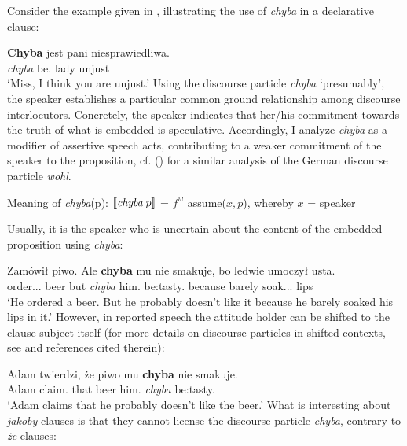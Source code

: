 \documentclass[output=paper
,modfonts
,nonflat]{langsci/langscibook}
\begin{document}
\noindent Consider the example given in , illustrating the use of \emph{chyba} in a declarative clause:

\ea \gll \textbf{Chyba} jest pani niesprawiedliwa. \label{chyba} \\
		\emph{chyba} be.{\thirdperson}{\sg} lady unjust \\
\glt	`Miss, I think you are unjust.' 
\z
Using the discourse particle \emph{chyba} `presumably', the speaker establishes a particular common ground relationship among discourse interlocutors. Concretely, the speaker indicates that her\slash his commitment towards the truth of what is embedded is speculative. Accordingly, I analyze \emph{chyba} as a modifier of assertive speech acts, contributing to a weaker commitment of the speaker to the proposition, cf. \citeauthor{Zimmermann2004} (\citeyear{Zimmermann2004, Zimmermann2011a})  for a similar analysis of the German discourse particle \emph{wohl}.

\ea	Meaning of \emph{chyba}(p): \newline
	\([\![\emph{chyba} \; p]\!]\) = $f^{w}$ assume(\( x,p \)), whereby \(x\) = speaker
\z

\noindent Usually, it is the speaker who is uncertain about the content of the embedded proposition using \emph{chyba}:

\ea \gll Zamówił piwo. Ale \textbf{chyba} mu nie smakuje, bo ledwie umoczył usta. \\
		order.{\lptcp}.{\sg}.{\masc} beer but \emph{chyba} him.{\dat} {\negation} {be:tasty}.{\thirdperson}{\sg} because barely soak.{\lptcp}.{\sg}.{\masc} lips \\
\glt	`He ordered a beer. But he probably doesn't like it because he barely soaked his lips in it.' 
\z
However, in reported speech the attitude holder can be shifted to the clause subject itself (for more details on discourse particles in shifted contexts, see \textcite{Doring2013} and references cited therein):

\ea \gll Adam twierdzi, że piwo mu \textbf{chyba} nie smakuje. \\
		Adam claim.{\thirdperson}{\sg} that beer him.{\dat} \emph{chyba} {\negation} {be:tasty}.{\thirdperson}{\sg} \\
\glt	`Adam claims that he probably doesn't like the beer.'
\z
What is interesting about \emph{jakoby}-clauses is that they cannot license the discourse particle \emph{chyba}, contrary to \emph{że}-clauses:
\end{document}
